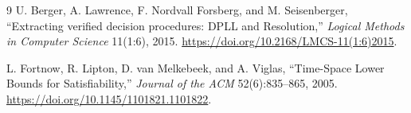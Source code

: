 \documentclass[11pt]{article}
\begin{document}
\begin{thebibliography}{9}
U. Berger, A. Lawrence, F. Nordvall Forsberg, and M. Seisenberger,
``Extracting verified decision procedures: DPLL and Resolution,''
\emph{Logical Methods in Computer Science} 11(1:6), 2015.
\url{https://doi.org/10.2168/LMCS-11(1:6)2015}.

L. Fortnow, R. Lipton, D. van Melkebeek, and A. Viglas,
``Time-Space Lower Bounds for Satisfiability,''
\emph{Journal of the ACM} 52(6):835--865, 2005.
\url{https://doi.org/10.1145/1101821.1101822}.
\end{thebibliography}
\end{document}
